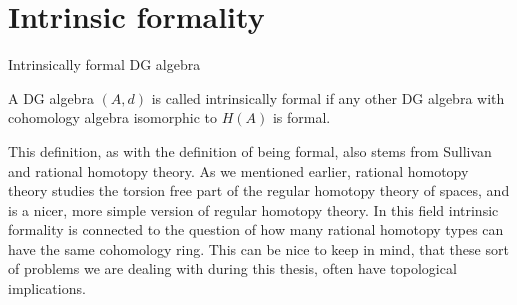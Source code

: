 
\section{Intrinsic formality}

\begin{definition}{Intrinsically formal DG algebra}

A DG algebra $(A, d)$ is called intrinsically formal if any other DG algebra with cohomology algebra isomorphic to $H(A)$ is formal. 
\end{definition}

This definition, as with the definition of being formal, also stems from Sullivan and rational homotopy theory. As we mentioned earlier, rational homotopy theory studies the torsion free part of the regular homotopy theory of spaces, and is a nicer, more simple version of regular homotopy theory. In this field intrinsic formality is connected to the question of how many rational homotopy types can have the same cohomology ring. This can be nice to keep in mind, that these sort of problems we are dealing with during this thesis, often have topological implications. 
